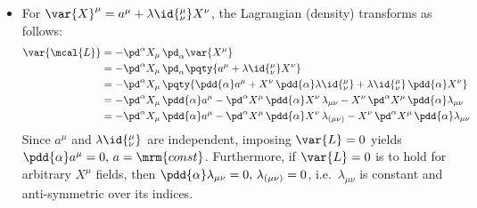 \documentclass[a4paper,10pt]{article}
\begin{document}
	\begin{itemize}
	\item For $
		\var{X}^\mu
		= a^\mu + \lambda\id{^\mu_\nu} X^\nu
	$, the Lagrangian (density) transforms as follows:
	\begin{equation}
	\begin{aligned}
		\var{\mcal{L}}
		&= -\pd^\alpha X_\mu\,
			\pd_\alpha \var{X^\mu} \\
		&= -\pd^\alpha X_\mu\,
			\pd_\alpha \pqty{
				a^\mu
				+ \lambda\id{^\mu_\nu} X^\nu
			} \\
		&= -\pd^\alpha X_\mu\,
			\pqty{
				\pdd{\alpha} a^\mu
				+ X^\nu\,
					\pdd{\alpha} \lambda\id{^\mu_\nu}
				+ \lambda\id{^\mu_\nu}\,
					\pdd{\alpha} X^\nu
			} \\
		&= -\pd^\alpha X_\mu\,\pdd{\alpha} a^\mu
		- \pd^\alpha X^\mu\,
			\pdd{\alpha} X^\nu\,
			\lambda_{\mu\nu}
		- X^\nu\,\pd^\alpha X^\mu\,
			\pdd{\alpha} \lambda_{\mu\nu} \\
		&= -\pd^\alpha X_\mu\,\pdd{\alpha} a^\mu
		- \pd^\alpha X^\mu\,
			\pdd{\alpha} X^\nu\,
			\lambda_{(\mu\nu)}
		- X^\nu\,\pd^\alpha X^\mu\,
			\pdd{\alpha} \lambda_{\mu\nu}
		\label{eq:lorentz_variation}
	\end{aligned}
	\end{equation}
	Since $a^\mu$ and $\lambda\id{^\mu_\nu}$ are independent, imposing $\var{L} = 0$ yields $\pdd{\alpha} a^\mu = 0,\,a = \mrm{const}$. Furthermore, if $\var{L} = 0$ is to hold for arbitrary $X^\mu$ fields, then $\pdd{\alpha} \lambda_{\mu\nu} = 0,\,\lambda_{(\mu\nu)} = 0$, i.e.\ $\lambda_{\mu\nu}$ is constant and anti-symmetric over its indices. 
	
	

\end{itemize}
\end{document}
